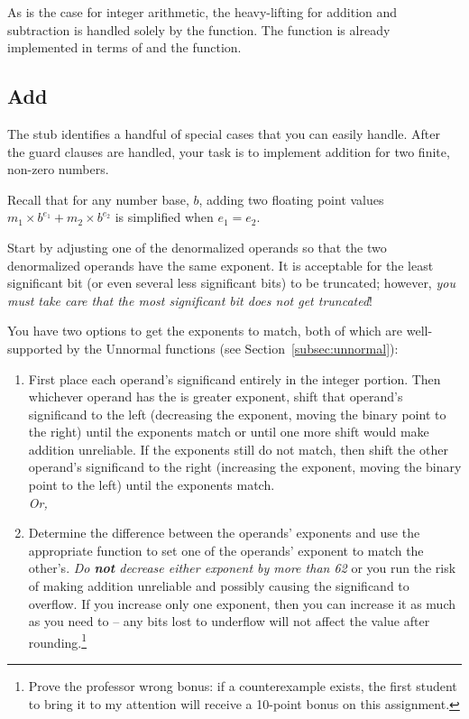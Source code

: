 As is the case for integer arithmetic, the heavy-lifting for addition and subtraction is handled solely by the  function.
The  function is already implemented in terms of  and the  function.

\subsection{Add}

The  stub identifies a handful of special cases that you can easily handle.
After the guard clauses are handled, your task is to implement addition for two finite, non-zero numbers.

Recall that for any number base, $b$, adding two floating point values $m_1 \times b^{e_1} + m_2 \times b^{e_2}$ is simplified when $e_1 = e_2$.

Start by adjusting one of the denormalized operands so that the two denormalized operands have the same exponent.
It is acceptable for the least significant bit (or even several less significant bits) to be truncated;
however, \textit{you must take care that the most significant bit does not get truncated}!

You have two options to get the exponents to match, both of which are well-supported by the Unnormal functions (see Section~\ref{subsec:unnormal}):
\begin{enumerate}
    \item First place each operand's significand entirely in the integer portion.
        Then whichever operand has the is greater exponent, shift that operand's significand to the left (decreasing the exponent, moving the binary point to the right) until the exponents match or until one more shift would make addition unreliable.
        If the exponents still do not match, then shift the other operand's significand to the right (increasing the exponent, moving the binary point to the left) until the exponents match. \\ \textit{Or,}
    \item Determine the difference between the operands' exponents and use the appropriate function to set one of the operands' exponent to match the other's.
        \textit{Do \textbf{not} decrease either exponent by more than 62} or you run the risk of making addition unreliable and possibly causing the significand to overflow.
        If you increase only one exponent, then you can increase it as much as you need to -- any bits lost to underflow will not affect the value after rounding.\footnote{
            Prove the professor wrong bonus: if a counterexample exists, the first student to bring it to my attention will receive a 10-point bonus on this assignment.
        }
\end{enumerate}

